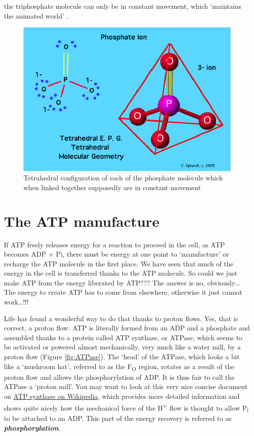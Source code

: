 \documentclass[]{book}
\theoremstyle{definition}
\theoremstyle{definition}
\theoremstyle{definition}
\theoremstyle{remark}
\begin{document}
the triphosphate molecule can only be in constant movement, which
`maintains the animated world' \citep{Degens1989-ip}.

\begin{figure}

{\centering \includegraphics[width=0.6\linewidth]{pictures/204phosphate} 

}

\caption{Tetrahedral configuration of each of the phosphate molecule which when linked together supposedly are in constant movement}\label{fig:PO4tetrahedra}
\end{figure}

\section{The ATP manufacture}\label{the-atp-manufacture}

If ATP freely releases energy for a reaction to proceed in the cell, as
ATP becomes ADP + Pi, there must be energy at one point to `manufacture'
or recharge the ATP molecule in the first place. We have seen that much
of the energy in the cell is transferred thanks to the ATP molecule. So
could we just make ATP from the energy liberated by ATP??? The answer is
no, obviously\ldots{} The energy to create ATP has to come from
elsewhere, otherwise it just cannot work\ldots{}!!!

Life has found a wonderful way to do that thanks to proton flows. Yes,
that is correct, a proton flow. ATP is literally formed from an ADP and
a phosphate and assembled thanks to a protein called ATP synthase, or
ATPase, which seems to be activated or powered almost mechanically, very
much like a water mill, by a proton flow (Figure \ref{fig:ATPase}). The
`head' of the ATPase, which looks a bit like a `mushroom hat', referred
to as the F\textsubscript{O} region, rotates as a result of the proton
flow and allows the phosphorylation of ADP. It is thus fair to call the
ATPase a `proton mill'. You may want to look at this very nice concise
document on \href{https://en.wikipedia.org/wiki/ATP_synthase}{ATP
synthase on Wikipedia}, which provides more detailed information and
shows quite nicely how the mechanical force of the H\textsuperscript{+}
flow is thought to allow P\textsubscript{i} to be attached to an ADP.
This part of the energy recovery is referred to as
\emph{\textbf{phosphorylation}}.
\end{document}
